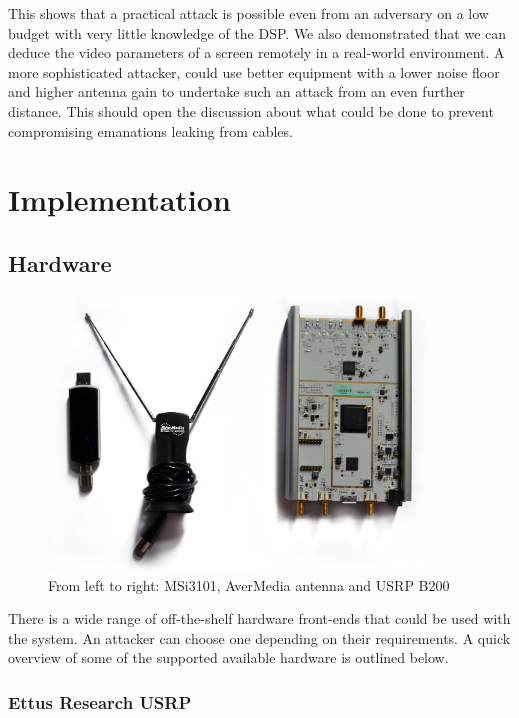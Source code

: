 \documentclass[a4paper,12pt,twoside,openright]{report}
\begin{document}
This shows that a practical attack is possible even from an adversary on a low budget with very little knowledge of the DSP. We also demonstrated that we can deduce the video parameters of a screen remotely in a real-world environment. A more sophisticated attacker, could use better equipment with a lower noise floor and higher antenna gain to undertake such an attack from an even further distance. This should open the discussion about what could be done to prevent compromising emanations leaking from cables.

\chapter{Implementation} 
\label{chap:implementation}

\section{Hardware}
\label{sec:hw} 

\begin{figure}[h!]
 
  \centering
    \includegraphics[width=0.9\textwidth]{equipment}
    \caption{From left to right: MSi3101, AverMedia antenna and USRP B200}
\end{figure}

There is a wide range of off-the-shelf hardware front-ends that could be used with the system. An attacker can choose one depending on their requirements. A quick overview of some of the supported available hardware is outlined below.

\subsection{Ettus Research USRP}
\end{document}

